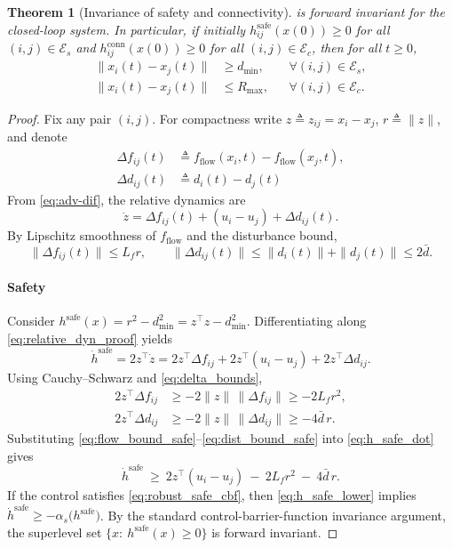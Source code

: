 \documentclass[conference]{IEEEconf}
\theoremstyle{plain}
\newtheorem{theorem}{Theorem} %
\begin{document}
\begin{theorem}[Invariance of safety and connectivity]
is forward invariant for the closed-loop system. In particular, if initially
$h^{\mathrm{safe}}_{ij}(x(0))\ge 0$ for all $(i,j)\in\mathcal{E}_s$ and
$h^{\mathrm{conn}}_{ij}(x(0))\ge 0$ for all $(i,j)\in\mathcal{E}_c$,
then for all $t\ge 0$,
\begin{align}
\|x_i(t)-x_j(t)\| &\ge d_{\min}, &&\forall (i,j)\in \mathcal{E}_s,
\label{eq:safety_invariance}\\
\|x_i(t)-x_j(t)\| &\le R_{\max}, &&\forall (i,j)\in \mathcal{E}_c.
\label{eq:conn_invariance}
\end{align}
\end{theorem}

\begin{proof}
Fix any pair $(i,j)$. For compactness write $z \triangleq z_{ij}=x_i-x_j$, $r\triangleq \|z\|$, and denote
\[
\begin{aligned}
\Delta f_{ij}(t) &\triangleq f_{\text{flow}}(x_i,t)-f_{\text{flow}}(x_j,t),\\
\Delta d_{ij}(t) &\triangleq d_i(t)-d_j(t)
\end{aligned}
\]
From \eqref{eq:adv-dif}, the relative dynamics are
\begin{equation}
\dot z = \Delta f_{ij}(t) + (u_i-u_j) + \Delta d_{ij}(t).
\label{eq:relative_dyn_proof}
\end{equation}
By Lipschitz smoothness of $f_{\text{flow}}$ and the disturbance bound,
\begin{equation}
\|\Delta f_{ij}(t)\|\le L_f r,\qquad
\|\Delta d_{ij}(t)\|\le \|d_i(t)\|+\|d_j(t)\|\le 2\bar d.
\label{eq:delta_bounds}
\end{equation}

\paragraph{Safety}
Consider $h^{\mathrm{safe}}(x)=r^2-d_{\min}^2=z^\top z-d_{\min}^2$. Differentiating along \eqref{eq:relative_dyn_proof} yields
\begin{equation}
\dot h^{\mathrm{safe}}
= 2 z^\top \dot z
= 2 z^\top \Delta f_{ij} + 2 z^\top (u_i-u_j) + 2 z^\top \Delta d_{ij}.
\label{eq:h_safe_dot}
\end{equation}
Using Cauchy--Schwarz and \eqref{eq:delta_bounds},
\begin{align}
2 z^\top \Delta f_{ij}
&\ge -2\|z\|\,\|\Delta f_{ij}\|\ge -2L_f r^2,
\label{eq:flow_bound_safe}\\
2 z^\top \Delta d_{ij}
&\ge -2\|z\|\,\|\Delta d_{ij}\|\ge -4\bar d\, r.
\label{eq:dist_bound_safe}
\end{align}
Substituting \eqref{eq:flow_bound_safe}--\eqref{eq:dist_bound_safe} into \eqref{eq:h_safe_dot} gives
\begin{equation}
\dot h^{\mathrm{safe}}
\ \ge\
2 z^\top (u_i-u_j)\ -\ 2L_f r^2\ -\ 4\bar d\, r.
\label{eq:h_safe_lower}
\end{equation}
If the control satisfies \eqref{eq:robust_safe_cbf}, then \eqref{eq:h_safe_lower} implies
$\dot h^{\mathrm{safe}} \ge -\alpha_s\big(h^{\mathrm{safe}}\big)$.
By the standard control-barrier-function invariance argument, the superlevel set
$\{x:\ h^{\mathrm{safe}}(x)\ge 0\}$ is forward invariant.


\end{proof}
\end{document}
